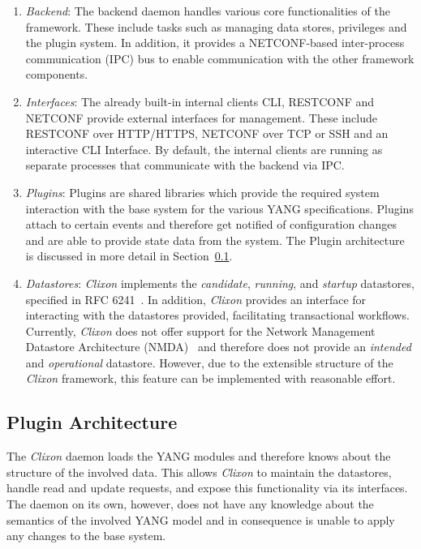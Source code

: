 \begin{enumerate}
    \item \textit{Backend}: The backend daemon handles various core functionalities of the framework. These include tasks such as managing data stores, privileges and the plugin system. In addition, it provides a \mbox{NETCONF-based} inter-process communication (IPC) bus to enable communication with the other framework components.
    
    \item \textit{Interfaces}: The already built-in internal clients CLI, RESTCONF and NETCONF provide external interfaces for management. These include RESTCONF over HTTP/HTTPS, NETCONF over TCP or SSH and an interactive CLI Interface. By default, the internal clients are running as separate processes that communicate with the backend via IPC.

    \item \textit{Plugins}: Plugins are shared libraries which provide the required system interaction with the base system for the various YANG specifications. Plugins attach to certain events and therefore get notified of configuration changes and are able to provide state data from the system. The Plugin architecture is discussed in more detail in Section~\ref{sec:clixon-framework_plugin-architecture}.

    \item \textit{Datastores}: \textit{Clixon} implements the \textit{candidate}, \textit{running}, and \textit{startup} datastores, specified in RFC 6241~\cite{RFC6241}. In addition, \textit{Clixon} provides an interface for interacting with the datastores provided, facilitating transactional workflows. Currently, \textit{Clixon} does not offer support for the Network Management Datastore Architecture (NMDA)~\cite{RFC8342} and therefore does not provide an \textit{intended} and \textit{operational} datastore. However, due to the extensible structure of the \textit{Clixon} framework, this feature can be implemented with reasonable effort.
\end{enumerate}


\subsection{Plugin Architecture}
\label{sec:clixon-framework_plugin-architecture}

The \textit{Clixon} daemon loads the YANG modules and therefore knows about the structure of the involved data. This allows \textit{Clixon} to maintain the datastores, handle read and update requests, and expose this functionality via its interfaces. The daemon on its own, however, does not have any knowledge about the semantics of the involved YANG model and in consequence is unable to apply any changes to the base system.

